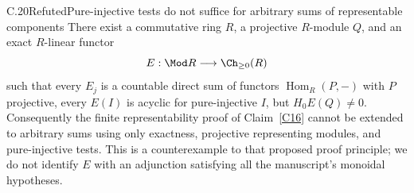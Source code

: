 \begin{claim}{C.20}{Refuted}{Pure-injective tests do not suffice for arbitrary sums of representable components}\label{C20}
There exist a commutative ring $R$, a projective $R$-module $Q$, and an exact $R$-linear functor
\[
 E:\Mod R\longrightarrow\Ch_{\geq0}(R)
\]
such that every $E_j$ is a countable direct sum of functors $\operatorname{Hom}_R(P,-)$ with $P$ projective, every $E(I)$ is acyclic for pure-injective $I$, but $H_0E(Q)\ne0$. Consequently the finite representability proof of Claim~\ref{C16} cannot be extended to arbitrary sums using only exactness, projective representing modules, and pure-injective tests. This is a counterexample to that proposed proof principle; we do not identify $E$ with an adjunction satisfying all the manuscript's monoidal hypotheses.
\end{claim}

